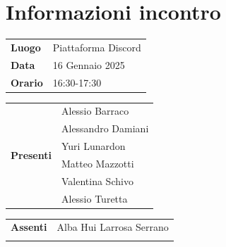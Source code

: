 \section{Informazioni incontro}
\vspace{0.25cm}
\begin{tabular}{p{1.75cm} | l}
    \textbf{Luogo} & Piattaforma Discord\\
    \textbf{Data} & 16 Gennaio 2025\\
    \textbf{Orario} & 16:30-17:30\\
\end{tabular}

\vspace{0.5cm}
\noindent
\begin{tabular}{p{1.75cm} | l}
    \multirow{7}{*}{\textbf{Presenti}}
        & Alessio Barraco\\
        & Alessandro Damiani \\ %
        & Yuri Lunardon\\
        & Matteo Mazzotti\\
        & Valentina Schivo\\
        & Alessio Turetta
\end{tabular}

\vspace{0.5cm}
\noindent
\begin{tabular}{p{1.75cm} | l}
    \multirow{1}{*}{\textbf{Assenti}}
        & Alba Hui Larrosa Serrano\\\\
\end{tabular}

